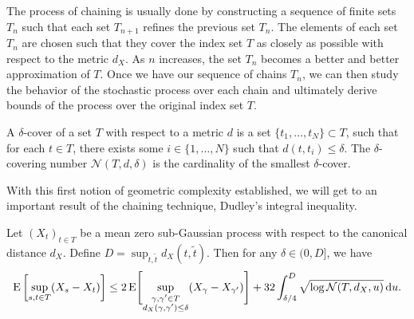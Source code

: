 The process of chaining is usually done by constructing a sequence of finite sets \(T_n\) such that each set \(T_{n+1}\) refines the previous set \(T_n\). 
The elements of each set \(T_n\) are chosen such that they cover the index set \(T\) as closely as possible with respect to the metric \(d_{X}\).
As \(n\) increases, the set \(T_n\) becomes a better and better approximation of \(T\).
Once we have our sequence of chains \(T_n\), we can then study the behavior of the stochastic process over each chain and ultimately derive bounds of the process over the original index set \(T\).
%
\begin{definition}
    A $\delta$-cover of a set $T$ with respect to a metric $d$ is a set \( \{ t_{1},\dots, t_{N} \} \subset T \), such that for each \( t \in T \), there exists some \( i \in \{ 1, \dots, N \} \) such that \( d(t,t_{i}) \leq \delta \). The $\delta$-covering number \( \mathcal{N}(T,d,\delta) \) is the cardinality of the smallest $\delta$-cover.
\end{definition}
%
With this first notion of geometric complexity established, we will get to an important result of the chaining technique, Dudley's integral inequality.
\begin{theorem}\label{thm:dudley_int_ineq}
    Let \((X_{t})_{t \in T}\) be a mean zero sub-Gaussian process with respect to the canonical distance \(d_{X}\).  
    Define \( D = \sup_{t,\widetilde{t}} d_{X}(t,\widetilde{t}) \).
    Then for any \( \delta \in (0,D] \), we have
    \[
        \E\left[\sup_{s,t \in T}(X_{s}-X_{t})\right] \leq 2 \E \Biggl[ \sup_{\substack{\gamma,\gamma' \in T \\ d_{X}(\gamma,\gamma') \leq \delta}} (X_{\gamma}- X_{\gamma'}) \Biggr] + 32 \int_{\delta/4}^{D} \sqrt{ \log \mathcal{N}(T,d_{X},u)} \dx[u]. 
    \]
    
\end{theorem}

